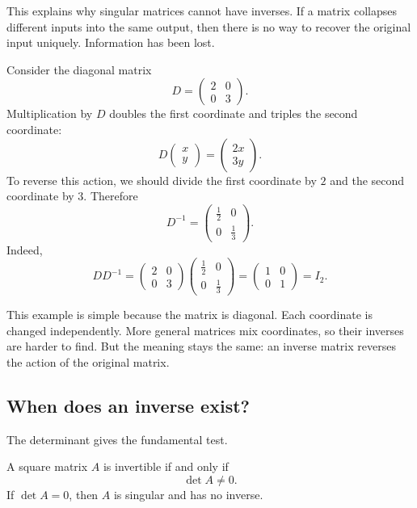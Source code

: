 This explains why singular matrices cannot have inverses. If a matrix collapses different inputs into the same output, then there is no way to recover the original input uniquely. Information has been lost.

\begin{examplebox}
Consider the diagonal matrix
\[
D=\begin{pmatrix}
2&0\\
0&3
\end{pmatrix}.
\]
Multiplication by \(D\) doubles the first coordinate and triples the second coordinate:
\[
D\begin{pmatrix}x\\y\end{pmatrix}
=\begin{pmatrix}2x\\3y\end{pmatrix}.
\]
To reverse this action, we should divide the first coordinate by \(2\) and the second coordinate by \(3\). Therefore
\[
D^{-1}=\begin{pmatrix}
\frac12&0\\
0&\frac13
\end{pmatrix}.
\]
Indeed,
\[
DD^{-1}=\begin{pmatrix}2&0\\0&3\end{pmatrix}
\begin{pmatrix}\frac12&0\\0&\frac13\end{pmatrix}
=\begin{pmatrix}1&0\\0&1\end{pmatrix}=I_2.
\]
\end{examplebox}

This example is simple because the matrix is diagonal. Each coordinate is changed independently. More general matrices mix coordinates, so their inverses are harder to find. But the meaning stays the same: an inverse matrix reverses the action of the original matrix.

\subsection{When does an inverse exist?}

The determinant gives the fundamental test.

\begin{theorembox}
A square matrix \(A\) is invertible if and only if
\[
\det A\ne0.
\]
If \(\det A=0\), then \(A\) is singular and has no inverse.
\end{theorembox}

